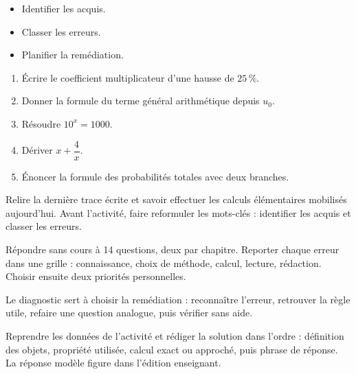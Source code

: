 \begin{objectifs}\begin{itemize}\item Identifier les acquis.\item Classer les erreurs.\item Planifier la remédiation.\end{itemize}\end{objectifs}
\begin{automatismes}\begin{enumerate}\item Écrire le coefficient multiplicateur d'une hausse de $25\,\%$. \item Donner la formule du terme général arithmétique depuis $u_0$. \item Résoudre $10^x=1000$. \item Dériver $x+\dfrac4x$. \item Énoncer la formule des probabilités totales avec deux branches. \end{enumerate}\end{automatismes}
\begin{prerequis}Relire la dernière trace écrite et savoir effectuer les calculs élémentaires mobilisés aujourd'hui. Avant l'activité, faire reformuler les mots-clés : identifier les acquis et classer les erreurs.\end{prerequis}

\begin{activite}
Répondre sans cours à 14 questions, deux par chapitre. Reporter chaque erreur dans une grille : connaissance, choix de méthode, calcul, lecture, rédaction. Choisir ensuite deux priorités personnelles.

\end{activite}

\begin{traceecrite}Le diagnostic sert à choisir la remédiation : reconnaître l'erreur, retrouver la règle utile, refaire une question analogue, puis vérifier sans aide.\end{traceecrite}

\begin{exemple}
Reprendre les données de l'activité et rédiger la solution dans l'ordre : définition des objets, propriété utilisée, calcul exact ou approché, puis phrase de réponse. La réponse modèle figure dans l'édition enseignant.
\end{exemple}

